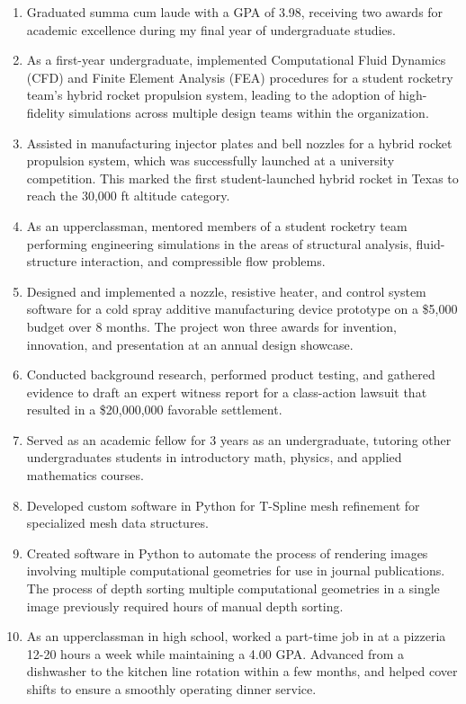 \documentclass[letterpaper,11pt]{article}
\begin{document}
  \begin{enumerate} %
    
    \item Graduated summa cum laude with a GPA of 3.98, receiving two awards for academic excellence during my final year of undergraduate studies.
    
    \item As a first-year undergraduate, implemented Computational Fluid Dynamics (CFD) and Finite Element Analysis (FEA) procedures for a student rocketry team’s hybrid rocket propulsion system, leading to the adoption of high-fidelity simulations across multiple design teams within the organization.
    
    \item Assisted in manufacturing injector plates and bell nozzles for a hybrid rocket propulsion system, which was successfully launched at a university competition. This marked the first student-launched hybrid rocket in Texas to reach the 30,000 ft altitude category.

    \item As an upperclassman, mentored members of a student rocketry team performing engineering simulations in the areas of structural analysis, fluid-structure interaction, and compressible flow problems.

    \item Designed and implemented a nozzle, resistive heater, and control system software for a cold spray additive manufacturing device prototype on a \$5,000 budget over 8 months. The project won three awards for invention, innovation, and presentation at an annual design showcase.

    \item Conducted background research, performed product testing, and gathered evidence to draft an expert witness report for a class-action lawsuit that resulted in a \$20,000,000 favorable settlement.

    \item Served as an academic fellow for 3 years as an undergraduate, tutoring other undergraduates students in introductory math, physics, and applied mathematics courses.  

    \item Developed custom software in Python for T-Spline mesh refinement for specialized mesh data structures. 

    \item Created software in Python to automate the process of rendering images involving multiple computational geometries for use in journal publications. The process of depth sorting multiple computational geometries in a single image previously required hours of manual depth sorting. 

    \item As an upperclassman in high school, worked a part-time job in at a pizzeria 12-20 hours a week while maintaining a 4.00 GPA. Advanced from a dishwasher to the kitchen line rotation within a few months, and helped cover shifts to ensure a smoothly operating dinner service.   

  \end{enumerate}
\end{document}
